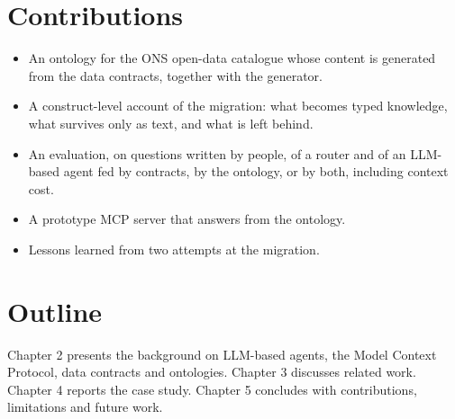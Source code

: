 \section{Contributions}
\begin{itemize}[leftmargin=1.5cm]
\item An ontology for the ONS open-data catalogue whose content is generated from the data
contracts, together with the generator.
\item A construct-level account of the migration: what becomes typed knowledge, what
survives only as text, and what is left behind.
\item An evaluation, on questions written by people, of a router and of an LLM-based agent
fed by contracts, by the ontology, or by both, including context cost.
\item A prototype MCP server that answers from the ontology.
\item Lessons learned from two attempts at the migration.
\end{itemize}

\section{Outline}
Chapter 2 presents the background on LLM-based agents, the Model Context Protocol, data
contracts and ontologies. Chapter 3 discusses related work. Chapter 4 reports the case
study. Chapter 5 concludes with contributions, limitations and future work.
